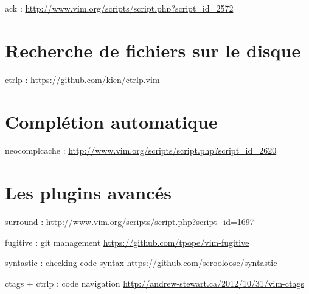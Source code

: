 ack : \url{http://www.vim.org/scripts/script.php?script\_id=2572}

\section{Recherche de fichiers sur le disque}

ctrlp : \url{https://github.com/kien/ctrlp.vim}

\section{Complétion automatique}

neocomplcache : \url{http://www.vim.org/scripts/script.php?script\_id=2620}

\section{Les plugins avancés}

surround : \url{http://www.vim.org/scripts/script.php?script\_id=1697}

fugitive : git management \url{https://github.com/tpope/vim-fugitive}

syntastic : checking code syntax \url{https://github.com/scrooloose/syntastic}

ctags + ctrlp : code navigation \url{http://andrew-stewart.ca/2012/10/31/vim-ctags}
